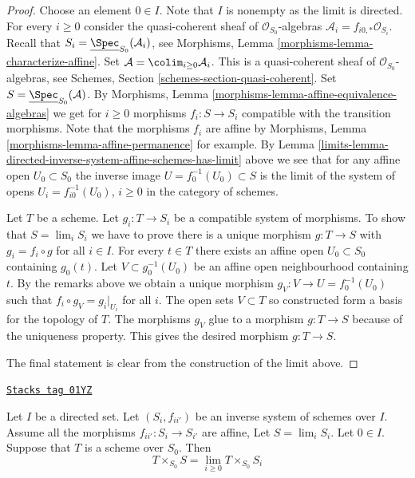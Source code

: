 \begin{proof}

Choose an element $0 \in I$. Note that $I$ is nonempty as the limit is
directed. For every $i \geq 0$ consider the quasi-coherent sheaf of
$\mathcal{O}_{S_0}$-algebras $\mathcal{A}_i = f_{i0, *}\mathcal{O}_{S_i}$.
Recall that $S_i = \underline{\Spec}_{S_0}(\mathcal{A}_i)$,
see Morphisms, Lemma \ref{morphisms-lemma-characterize-affine}.
Set $\mathcal{A} = \colim_{i \geq 0} \mathcal{A}_i$.
This is a quasi-coherent sheaf of $\mathcal{O}_{S_0}$-algebras,
see Schemes, Section \ref{schemes-section-quasi-coherent}.
Set $S = \underline{\Spec}_{S_0}(\mathcal{A})$.
By Morphisms, Lemma \ref{morphisms-lemma-affine-equivalence-algebras}
we get for $i \geq 0$ morphisms $f_i : S \to S_i$ compatible with
the transition morphisms. Note that the morphisms $f_i$ are
affine by Morphisms, Lemma \ref{morphisms-lemma-affine-permanence} for example.
By Lemma \ref{limits-lemma-directed-inverse-system-affine-schemes-has-limit} above
we see that for any affine open $U_0 \subset S_0$ the
inverse image $U = f_0^{-1}(U_0) \subset S$ is the limit of the
system of opens $U_i = f_{i0}^{-1}(U_0)$, $i \geq 0$ in the
category of schemes.

\medskip\noindent
Let $T$ be a scheme. Let $g_i : T \to S_i$ be a compatible system
of morphisms. To show that $S = \lim_i S_i$ we have
to prove there is a unique morphism $g : T \to S$ with
$g_i = f_i \circ g$ for all $i \in I$.
For every $t \in T$ there exists an affine open
$U_0 \subset S_0$ containing $g_0(t)$. Let $V \subset g_0^{-1}(U_0)$
be an affine open neighbourhood containing $t$.
By the remarks above we obtain a unique morphism
$g_V : V \to U = f_0^{-1}(U_0)$ such that $f_i \circ g_V = g_i|_{U_i}$
for all $i$. The open sets $V \subset T$ so constructed form
a basis for the topology of $T$. The morphisms $g_V$ glue to a morphism
$g : T \to S$ because of the uniqueness property. This gives the
desired morphism $g : T \to S$.

\medskip\noindent
The final statement is clear from the construction of the limit above.
\end{proof}

\begin{lemma}
\label{limits-lemma-scheme-over-limit}
\href{https://stacks.math.columbia.edu/tag/01YZ}{\texttt{Stacks tag 01YZ}}

Let $I$ be a directed set.
Let $(S_i, f_{ii'})$ be an inverse system of schemes over $I$.
Assume all the morphisms $f_{ii'} : S_i \to S_{i'}$ are affine,
Let $S = \lim_i S_i$. Let $0 \in I$.
Suppose that $T$ is a scheme over $S_0$.
Then
$$
T \times_{S_0} S = \lim_{i \geq 0} T \times_{S_0} S_i
$$
\end{lemma}

